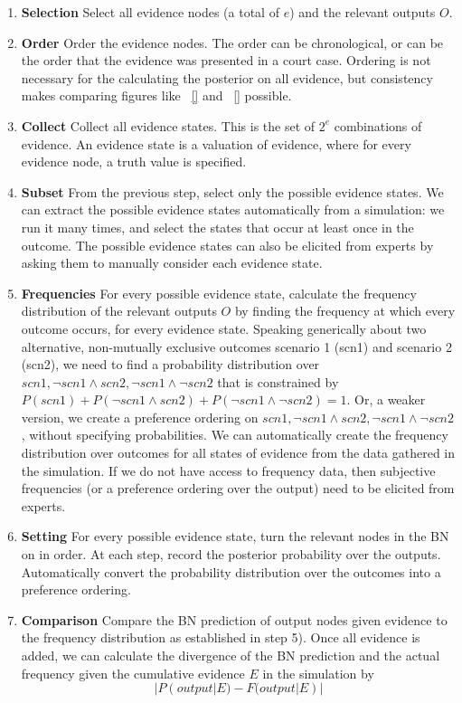 \documentclass[12pt]{article}
\begin{document}
\begin{enumerate}
\item \textbf{Selection} Select all evidence nodes (a total of $e$) and the relevant outputs $O$.
\item \textbf{Order} Order the evidence nodes. The order can be chronological, or can be the order that the evidence was presented in a court case. Ordering is not necessary for the calculating the posterior on all evidence, but consistency makes comparing figures like ~\ref{} and ~\ref{} possible.
\item \textbf{Collect} Collect all evidence states. This is the set of $2^e$ combinations of evidence. An evidence state is a valuation of evidence, where for every evidence node, a truth value is specified. 
\item \textbf{Subset} From the previous step, select only the possible evidence states. We can extract the possible evidence states automatically from a simulation: we run it many times, and select the states that occur at least once in the outcome. The possible evidence states can also be elicited from experts by asking them to manually consider each evidence state.
\item \textbf{Frequencies} For every possible evidence state, calculate the frequency distribution of the relevant outputs $O$ by finding the frequency at which every outcome occurs, for every evidence state. Speaking generically about two alternative, non-mutually exclusive outcomes scenario 1 (scn1) and scenario 2 (scn2), we need to find a probability distribution over $scn1, \neg scn1 \land scn2, \neg scn1 \land \neg scn2$ that is constrained by $P(scn1) + P(\neg scn1 \land scn2) + P(\neg scn1 \land \neg scn2) = 1$. Or, a weaker version, we create a preference ordering on $scn1, \neg scn1 \land scn2, \neg scn1 \land \neg scn2$, without specifying probabilities. 
We can automatically create the frequency distribution over outcomes for all states of evidence from the data gathered in the simulation. If we do not have access to frequency data, then subjective frequencies (or a preference ordering over the output) need to be elicited from experts.
\item \textbf{Setting} For every possible evidence state, turn the relevant nodes in the BN on in order. At each step, record the posterior probability over the outputs. Automatically convert the probability distribution over the outcomes into a preference ordering.
\item \textbf{Comparison} Compare the BN prediction of output nodes given evidence to the frequency distribution as established in step 5). Once all evidence is added, we can calculate the divergence of the BN prediction and the actual frequency given the cumulative evidence $E$ in the simulation by \[|P(output|E) - F(output|E)|\]

\end{enumerate}
\end{document}
